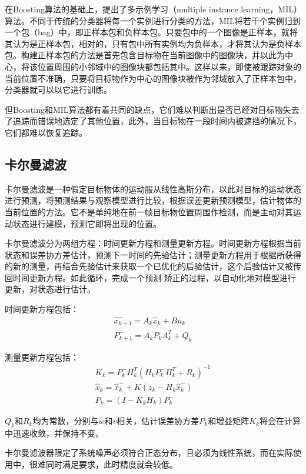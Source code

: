   在Boosting算法的基础上，\citet{babenko2009visual}提出了多示例学习（multiple instance learning，MIL）算法。不同于传统的分类器将每一个实例进行分类的方法，MIL将若干个实例归到一个包（bag）中，即正样本包和负样本包。只要包中的一个图像是正样本，就将其认为是正样本包，相对的，只有包中所有实例均为负样本，才将其认为是负样本包。构建正样本包的方法是首先包含目标物在当前图像中的图像块，并以此为中心，将该位置周围的小邻域中的图像块都包括其中。这样以来，即使被跟踪对象的当前位置不准确，只要将目标物作为中心的图像块被作为邻域放入了正样本包中，分类器就可以以它进行训练。

  但Boosting和MIL算法都有着共同的缺点，它们难以判断出是否已经对目标物失去了追踪而错误地选定了其他位置，此外，当目标物在一段时间内被遮挡的情况下，它们都难以恢复追踪。

\subsection{卡尔曼滤波}

  卡尔曼滤波是一种假定目标物体的运动服从线性高斯分布，以此对目标的运动状态进行预测，将预测结果与观察模型进行比较，根据误差更新预测模型，估计物体的当前位置的方法。它不是单纯地在前一帧目标物位置周围作检测，而是主动对其运动状态进行建模，预测它即将出现的位置\cite{welch1995introduction}。
  
  卡尔曼滤波分为两组方程：时间更新方程和测量更新方程。时间更新方程根据当前状态和误差协方差估计，预测下一时间的先验估计；测量更新方程用于根据所获得的新的测量，再结合先验估计来获取一个已优化的后验估计，这个后验估计又被传回时间更新方程。如此循环，完成一个预测-矫正的过程，以自动化地对模型进行更新，对状态进行估计。

  时间更新方程包括：
\begin{gather*}
\hat{x}^{-}_{k+1}=A_k \hat{x}_k + B u_k \\
P^{-}_{k+1}=A_k P_k A^T_k + Q_k
\end{gather*}

  测量更新方程包括：
\begin{gather*}
K_k=P^{-}_k H^T_k(H_k P^{-}_k H^T_k + R_k)^{-1} \\
\hat{x}_k = \hat{x}^{-}_k + K (z_k - H_k \hat{x}^{-}_k) \\
P_k = (I-K_k H_k)P^{-}_k
\end{gather*}

  $Q_k$和$R_k$均为常数，分别与$w$和$v$相关，估计误差协方差$P_k$和增益矩阵$K_k$将会在计算中迅速收敛，并保持不变。

  卡尔曼滤波器限定了系统噪声必须符合正态分布，且必须为线性系统，而在实际使用中，很难同时满足要求，此时精度就会较低。


